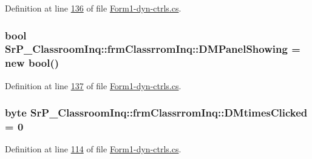 \-Definition at line \hyperlink{_form1-dyn-ctrls_8cs_source_l00136}{136} of file \hyperlink{_form1-dyn-ctrls_8cs_source}{\-Form1-\/dyn-\/ctrls.\-cs}.

\hypertarget{class_sr_p___classroom_inq_1_1frm_classrrom_inq_a7a4d3ad70d4284ad3f7d8ab3ca8718e0}{
\subsubsection[{\-D\-M\-Panel\-Showing}]{\setlength{\rightskip}{0pt plus 5cm}bool {\bf \-Sr\-P\-\_\-\-Classroom\-Inq\-::frm\-Classrrom\-Inq\-::\-D\-M\-Panel\-Showing} = new bool()}}
\label{class_sr_p___classroom_inq_1_1frm_classrrom_inq_a7a4d3ad70d4284ad3f7d8ab3ca8718e0}


\-Definition at line \hyperlink{_form1-dyn-ctrls_8cs_source_l00137}{137} of file \hyperlink{_form1-dyn-ctrls_8cs_source}{\-Form1-\/dyn-\/ctrls.\-cs}.

\hypertarget{class_sr_p___classroom_inq_1_1frm_classrrom_inq_a595a5c6942aa919d47de2b3e20f5f5bc}{
\subsubsection[{\-D\-Mtimes\-Clicked}]{\setlength{\rightskip}{0pt plus 5cm}byte {\bf \-Sr\-P\-\_\-\-Classroom\-Inq\-::frm\-Classrrom\-Inq\-::\-D\-Mtimes\-Clicked} = 0}}
\label{class_sr_p___classroom_inq_1_1frm_classrrom_inq_a595a5c6942aa919d47de2b3e20f5f5bc}


\-Definition at line \hyperlink{_form1-dyn-ctrls_8cs_source_l00114}{114} of file \hyperlink{_form1-dyn-ctrls_8cs_source}{\-Form1-\/dyn-\/ctrls.\-cs}.

